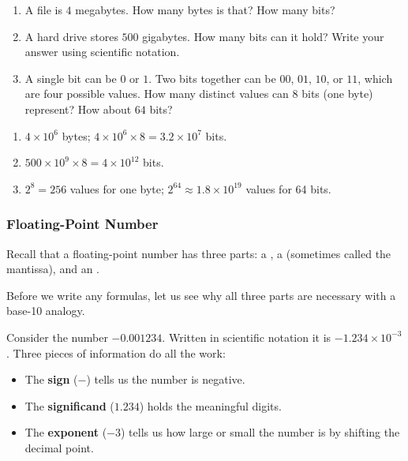 \begin{Exercise}[title={Bits and bytes}, label={ex:bits-bytes}]
  \begin{enumerate}
    \item A file is $4$ megabytes.
          How many bytes is that?
          How many bits?
    \item A hard drive stores $500$ gigabytes.
          How many bits can it hold?
          Write your answer using scientific notation.
    \item A single bit can be $0$ or $1$.
          Two bits together can be $00$, $01$, $10$, or $11$, which are four possible
          values.
          How many distinct values can $8$ bits (one byte) represent?
          How about $64$ bits?
  \end{enumerate}
\end{Exercise}
\begin{Answer}[ref={ex:bits-bytes}]
  \begin{enumerate}
    \item $4 \times 10^6$ bytes;\; $4 \times 10^6 \times 8 = 3.2 \times 10^7$
          bits.
    \item $500 \times 10^9 \times 8 = 4 \times 10^{12}$ bits.
    \item $2^8 = 256$ values for one byte;\;
          $2^{64} \approx 1.8 \times 10^{19}$ values for 64 bits.
  \end{enumerate}
\end{Answer}


\subsubsection{Floating-Point Number}

Recall that a floating-point number has three parts:
a , a
 (sometimes called the mantissa), and
an .

Before we write any formulas, let us see why all three parts are necessary
with a base-10 analogy.

Consider the number $-0.001234$.
Written in scientific notation it is $-1.234 \times 10^{-3}$.
Three pieces of information do all the work:
\begin{itemize}
  \item The \textbf{sign} ($-$) tells us the number is negative.
  \item The \textbf{significand} ($1.234$) holds the meaningful digits.
  \item The \textbf{exponent} ($-3$) tells us how large or small the number
        is by shifting the decimal point.
\end{itemize}

